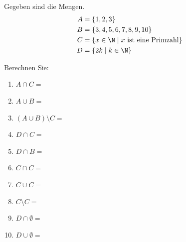 \begin{ExerciseBlock}
Gegeben sind die Mengen.
\[
\begin{aligned}
	A &= \left\lbrace 1, 2, 3 \right\rbrace \\
	B &= \left\lbrace 3, 4, 5, 6, 7, 8, 9, 10 \right\rbrace \\
	C &= \left\lbrace x \in \N \mid x\text{ ist eine Primzahl} \right\rbrace \\
	D &= \left\lbrace 2k \mid k \in \N \right\rbrace
\end{aligned}
\]

Berechnen Sie:
\begin{enumerate}[label=\alph*)]
	\item $\displaystyle  A \cap C = $
	\item $\displaystyle A \cup B = $
	\item $\displaystyle \left( A \cup B \right) \setminus C = $
	\item $\displaystyle D \cap C = $
	\item $\displaystyle D \cap B = $
	\item $\displaystyle C \cap C = $
	\item $\displaystyle C \cup C = $
	\item $\displaystyle C \setminus C = $
	\item $\displaystyle D \cap \emptyset = $
	\item $\displaystyle D \cup \emptyset = $
\end{enumerate}

\end{ExerciseBlock}
